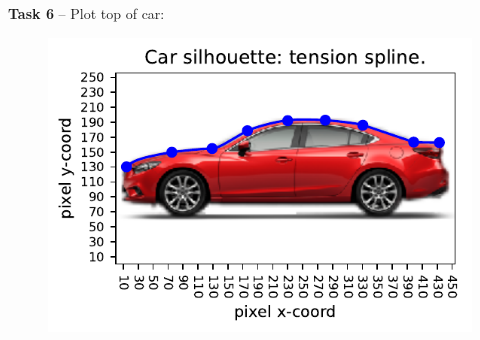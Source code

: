 \documentclass{article}
\newcommand{\T}[2]{\textbf{Task #1} -- #2:\\}
\begin{document}
\T{6}{Plot top of car}

  \begin{figure}[!ht]
    \center
    \includegraphics{figs/p2-car-tension-splines.pdf}
  \end{figure}
\end{document}
